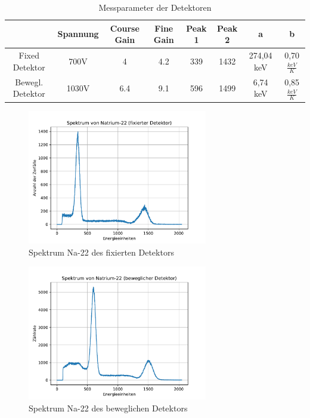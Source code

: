 \documentclass[11pt]{scrartcl}
\begin{document}
\begin{table}[h]
	\caption{Messparameter der Detektoren}
	\begin{tabular}{|c|c|c|c|c|c|c|c|}
	\hline
	 & Spannung & Course Gain & Fine Gain & Peak 1 & Peak 2 & a & b\\ \hline
	 Fixed Detektor & 700V & 4 & 4.2 & 339 & 1432 & 274,04 keV & 0,70 $\frac{keV}{K}$\\ \hline
	 Bewegl. Detektor & 1030V & 6.4 & 9.1 & 596 & 1499 & 6,74 keV & 0,85 $\frac{keV}{K}$\\ \hline
	\end{tabular}
\label{para}
\end{table}

\begin{figure}[htbp]  
     \includegraphics[width=0.7\textwidth]{Spektrum_von_Natrium-22_(fixierter_Detektor).pdf}
  \caption{Spektrum Na-22 des fixierten Detektors}
  \label{Na-fixed}
\end{figure}

\begin{figure}[htbp]  
     \includegraphics[width=0.7\textwidth]{Spektrum_von_Natrium-22_(beweglicher_Detektor).pdf}
  \caption{Spektrum Na-22 des beweglichen Detektors}
  \label{Na-beweg}
\end{figure}
\end{document}
